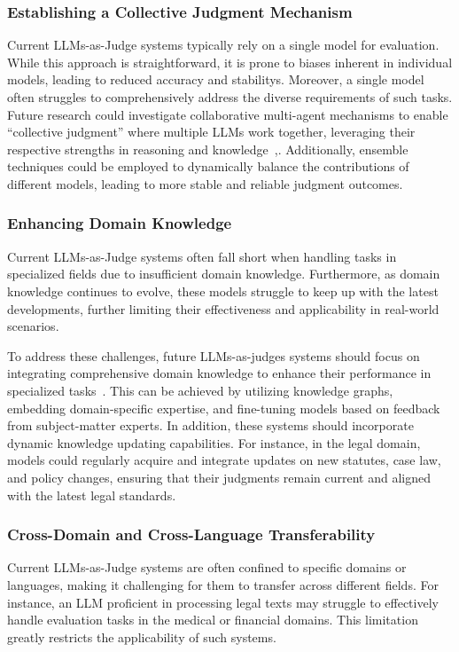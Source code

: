 \subsubsection{Establishing a Collective Judgment Mechanism}
Current LLMs-as-Judge systems typically rely on a single model for evaluation. While this approach is straightforward, it is prone to biases inherent in individual models, leading to reduced accuracy and stabilitys. Moreover, a single model often struggles to comprehensively address the diverse requirements of such tasks. Future research could investigate collaborative multi-agent mechanisms to enable ``collective judgment'' where multiple LLMs work together, leveraging their respective strengths in reasoning and knowledge~\cite{chan2023chateval,chu2024pre},. Additionally, ensemble techniques could be employed to dynamically balance the contributions of different models, leading to more stable and reliable judgment outcomes.


\subsubsection{Enhancing Domain Knowledge}

Current LLMs-as-Judge systems often fall short when handling tasks in specialized fields due to insufficient domain knowledge. Furthermore, as domain knowledge continues to evolve, these models struggle to keep up with the latest developments, further limiting their effectiveness and applicability in real-world scenarios.

To address these challenges, future LLMs-as-judges systems should focus on integrating comprehensive domain knowledge to enhance their performance in specialized tasks~\cite{raju2024constructing}. This can be achieved by utilizing knowledge graphs, embedding domain-specific expertise, and fine-tuning models based on feedback from subject-matter experts.
In addition, these systems should incorporate dynamic knowledge updating capabilities. For instance, in the legal domain, models could regularly acquire and integrate updates on new statutes, case law, and policy changes, ensuring that their judgments remain current and aligned with the latest legal standards.

\subsubsection{Cross-Domain and Cross-Language Transferability}
Current LLMs-as-Judge systems are often confined to specific domains or languages, making it challenging for them to transfer across different fields. For instance, an LLM proficient in processing legal texts may struggle to effectively handle evaluation tasks in the medical or financial domains. This limitation greatly restricts the applicability of such systems.

